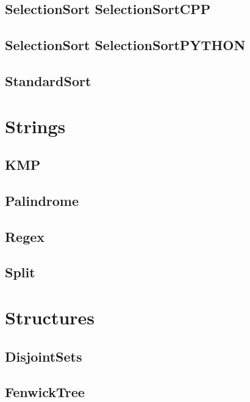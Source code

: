\subsection{SelectionSort SelectionSortCPP}
\raggedbottom
\hrulefill
\subsection{SelectionSort SelectionSortPYTHON}
\raggedbottom
\hrulefill
\subsection{ StandardSort}
\raggedbottom
\hrulefill

\section{Strings}
\subsection{ KMP}
\raggedbottom
\hrulefill
\subsection{ Palindrome}
\raggedbottom
\hrulefill
\subsection{ Regex}
\raggedbottom
\hrulefill
\subsection{ Split}
\raggedbottom
\hrulefill

\section{Structures}
\subsection{ DisjointSets}
\raggedbottom
\hrulefill
\subsection{ FenwickTree}
\raggedbottom
\hrulefill
